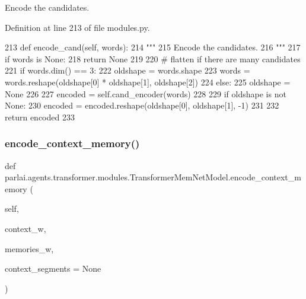 \begin{DoxyVerb}Encode the candidates.
\end{DoxyVerb}
 

Definition at line 213 of file modules.\+py.


\begin{DoxyCode}
213     \textcolor{keyword}{def }encode\_cand(self, words):
214         \textcolor{stringliteral}{"""}
215 \textcolor{stringliteral}{        Encode the candidates.}
216 \textcolor{stringliteral}{        """}
217         \textcolor{keywordflow}{if} words \textcolor{keywordflow}{is} \textcolor{keywordtype}{None}:
218             \textcolor{keywordflow}{return} \textcolor{keywordtype}{None}
219 
220         \textcolor{comment}{# flatten if there are many candidates}
221         \textcolor{keywordflow}{if} words.dim() == 3:
222             oldshape = words.shape
223             words = words.reshape(oldshape[0] * oldshape[1], oldshape[2])
224         \textcolor{keywordflow}{else}:
225             oldshape = \textcolor{keywordtype}{None}
226 
227         encoded = self.cand\_encoder(words)
228 
229         \textcolor{keywordflow}{if} oldshape \textcolor{keywordflow}{is} \textcolor{keywordflow}{not} \textcolor{keywordtype}{None}:
230             encoded = encoded.reshape(oldshape[0], oldshape[1], -1)
231 
232         \textcolor{keywordflow}{return} encoded
233 
\end{DoxyCode}
\mbox{\label{classparlai_1_1agents_1_1transformer_1_1modules_1_1TransformerMemNetModel_a12c6c4a26be5401e61c43ec4aa886812}} 
\subsubsection{\texorpdfstring{encode\+\_\+context\+\_\+memory()}{encode\_context\_memory()}}
{\footnotesize\ttfamily def parlai.\+agents.\+transformer.\+modules.\+Transformer\+Mem\+Net\+Model.\+encode\+\_\+context\+\_\+memory (\begin{DoxyParamCaption}\item[{}]{self,  }\item[{}]{context\+\_\+w,  }\item[{}]{memories\+\_\+w,  }\item[{}]{context\+\_\+segments = {\ttfamily None} }\end{DoxyParamCaption})}

